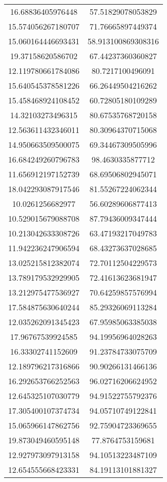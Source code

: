 \begin{table}
\begin{tabular}{cc}
16.68836405976448 & 57.51829078053829 \\
15.574056267180707 & 71.76665897449374 \\
15.060164446693431 & 58.913100869308316 \\
19.37158620586702 & 67.44237360360827 \\
12.119780661784086 & 80.7217100496091 \\
15.640545378581226 & 66.26449504216262 \\
15.458468924108452 & 60.72805180109289 \\
14.32103273496315 & 80.67535768720158 \\
12.563611432346011 & 80.30964370715068 \\
14.950663509500075 & 69.34467309505996 \\
16.684249260796783 & 98.4630335877712 \\
11.656912197152739 & 68.69506802945071 \\
18.042293087917546 & 81.55267224062344 \\
10.0261256682977 & 56.60289606877413 \\
10.529015679088708 & 87.79436009347444 \\
10.213042633308726 & 63.47193217049783 \\
11.942236247906594 & 68.43273637028685 \\
13.025215812382074 & 72.70112504229573 \\
13.789179532929905 & 72.41613623681947 \\
13.212975477536927 & 70.64259857576994 \\
17.584875630640244 & 85.29326069113284 \\
12.035262091345423 & 67.95985063385038 \\
17.96767539924585 & 94.19956964028263 \\
16.33302741152609 & 91.23784733075709 \\
12.189796217316866 & 90.90266131466136 \\
16.292653766252563 & 96.02716206624952 \\
12.645325107030779 & 94.91522755792376 \\
17.305400107374734 & 94.05710749122841 \\
15.065966147862756 & 92.75904723369655 \\
19.873049460595148 & 77.8764753159681 \\
12.927973097913158 & 94.10513223487109 \\
12.654555668423331 & 84.19113101881327 \\

\end{tabular}
\end{table}
